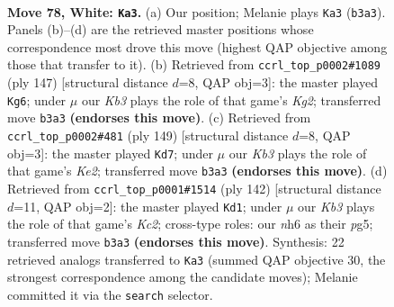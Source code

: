 \documentclass[11pt]{article}
\begin{document}
\clearpage

\begin{figure}[p]\centering
\begin{subfigure}{0.46\textwidth}\centering
\resizebox{\linewidth}{!}{%
\newchessgame
\chessboard[
  setfen={5k2/8/1P5n/P7/8/1K6/7r/4R3 w - - 19 78},
  showmover=false,
  pgfstyle=straightmove, color=movearrow, markmove={b3-a3}
]}
\caption{}
\end{subfigure}\hfill
\begin{subfigure}{0.46\textwidth}\centering
\resizebox{\linewidth}{!}{%
\newchessgame
\chessboard[
  setfen={8/6k1/8/5ppR/3P4/r7/5K1N/8 b - - 10 74},
  showmover=false,
  pgfstyle=straightmove, color=movearrow, markmove={g7-g6}
]}
\caption{}
\end{subfigure}
\\[4pt]
\begin{subfigure}{0.46\textwidth}\centering
\resizebox{\linewidth}{!}{%
\newchessgame
\chessboard[
  setfen={8/4k3/2R5/4p3/6K1/8/1rN5/8 b - - 0 75},
  showmover=false,
  pgfstyle=straightmove, color=movearrow, markmove={e7-d7}
]}
\caption{}
\end{subfigure}\hfill
\begin{subfigure}{0.46\textwidth}\centering
\resizebox{\linewidth}{!}{%
\newchessgame
\chessboard[
  setfen={5R2/8/8/6pP/4k3/6r1/2K5/8 w - - 10 72},
  showmover=false,
  pgfstyle=straightmove, color=movearrow, markmove={c2-d1}
]}
\caption{}
\end{subfigure}
\caption{\textbf{Move 78, White: \texttt{Ka3}.} (a) Our position; Melanie plays \texttt{Ka3} (\texttt{b3a3}). Panels (b)--(d) are the retrieved master positions whose correspondence most drove this move (highest QAP objective among those that transfer to it). (b) Retrieved from \texttt{ccrl\_top\_p0002\#1089} (ply 147) [structural distance $d$=8, QAP obj=3]: the master played \texttt{Kg6}; under $\mu$ our \emph{Kb3} plays the role of that game's \emph{Kg2}; transferred move \texttt{b3a3} \textbf{(endorses this move)}. (c) Retrieved from \texttt{ccrl\_top\_p0002\#481} (ply 149) [structural distance $d$=8, QAP obj=3]: the master played \texttt{Kd7}; under $\mu$ our \emph{Kb3} plays the role of that game's \emph{Ke2}; transferred move \texttt{b3a3} \textbf{(endorses this move)}. (d) Retrieved from \texttt{ccrl\_top\_p0001\#1514} (ply 142) [structural distance $d$=11, QAP obj=2]: the master played \texttt{Kd1}; under $\mu$ our \emph{Kb3} plays the role of that game's \emph{Kc2}; cross-type roles: our \emph{n}h6 as their \emph{p}g5; transferred move \texttt{b3a3} \textbf{(endorses this move)}. Synthesis: 22 retrieved analogs transferred to \texttt{Ka3} (summed QAP objective 30, the strongest correspondence among the candidate moves); Melanie committed it via the \texttt{search} selector.}
\label{fig:thought-m154}
\end{figure}
\end{document}
